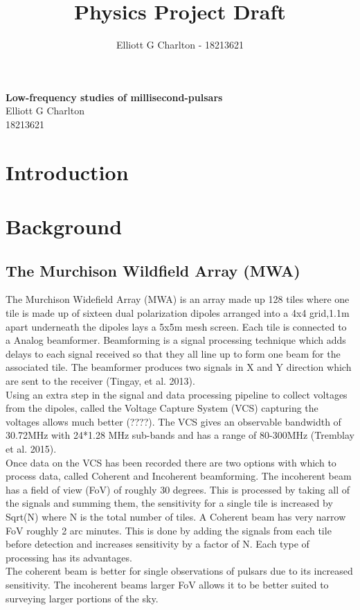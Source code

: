 \documentclass[draft]{article}
\title {Physics Project Draft}
\author{Elliott G Charlton - 18213621}
\newcommand{\pra}{\medskip\\}
\begin{document}
	\begin{titlepage}
	\centering
	
	{\Huge\textbf{ Low-frequency studies of millisecond-pulsars}} \\
 \bigskip\bigskip
		{\LARGE Elliott G Charlton} \\
		\bigskip
		{\LARGE 18213621}\\
		
\end{titlepage}

\maketitle

\tableofcontents{}
\newpage
\section{Introduction}

\section{Background}
\subsection{The Murchison Wildfield Array (MWA)}

The Murchison Widefield Array (MWA) is an array made up 128 tiles where one tile is made up of sixteen dual polarization dipoles arranged into a 4x4 grid,1.1m apart underneath the dipoles lays a 5x5m mesh screen. Each tile is connected to a Analog beamformer. Beamforming is a signal processing technique which adds delays to each signal received so that they all line up to form one beam for the associated tile. The beamformer produces two signals in X and Y direction  which are sent to the receiver (Tingay, et al. 2013). \pra
Using an extra step in the signal and data processing pipeline to collect voltages from the dipoles, called the Voltage Capture System (VCS) capturing the voltages allows much better (????). The VCS gives an observable bandwidth of 30.72MHz with 24*1.28 MHz sub-bands and has a range of 80-300MHz (Tremblay et al. 2015). \pra
Once data on the VCS has been recorded there are two options with which to process data, called Coherent and Incoherent beamforming. The incoherent beam has a field of view (FoV) of roughly 30 degrees. This is processed by taking all of the signals and summing them, the sensitivity for a single tile is increased by Sqrt(N) where N is the total number of tiles. A Coherent beam has very narrow FoV roughly 2 arc minutes. This is done by adding the signals from each tile before detection and increases sensitivity by a factor of N. Each type of processing has its advantages.\pra
The coherent beam is better for single observations of pulsars due to its increased sensitivity. The incoherent beams larger FoV allows it to be better suited to surveying larger portions of the sky.
\end{document}
